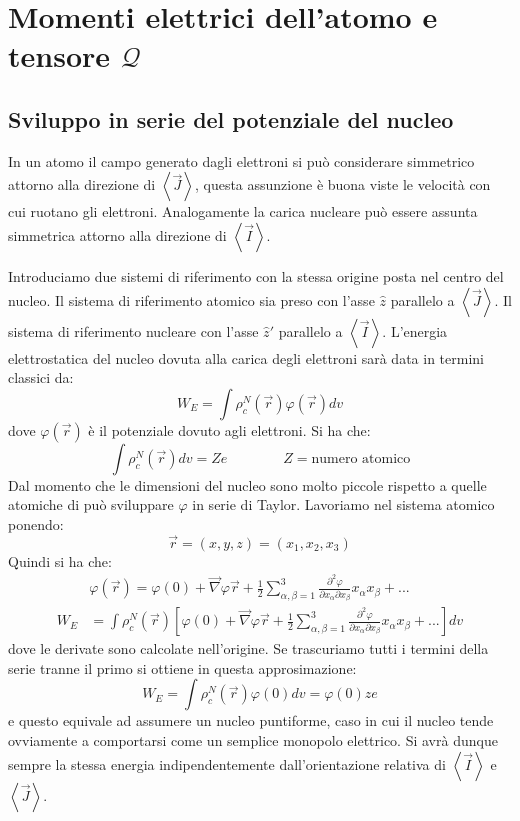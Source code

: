 \section{Momenti elettrici dell'atomo e tensore $\mathcal{Q}$}
\subsection{Sviluppo in serie del potenziale del nucleo}
In un atomo il campo generato dagli elettroni si può considerare simmetrico
attorno alla direzione di $\left\langle \vec{J} \right\rangle$, questa
assunzione è buona viste le velocità con cui ruotano gli elettroni. Analogamente
la carica nucleare può essere assunta simmetrica attorno alla direzione di
$\left\langle \vec{I} \right\rangle$.

Introduciamo due sistemi di riferimento con la stessa origine posta nel centro
del nucleo. Il sistema di riferimento atomico sia preso con l'asse $\hat{z}$
parallelo a $\left\langle \vec{J} \right\rangle$. Il sistema di riferimento
nucleare con l'asse $\hat{z}'$ parallelo a $\left\langle \vec{I} \right\rangle$.
L'energia elettrostatica del nucleo dovuta alla carica degli elettroni sarà data
in termini classici da:
\begin{equation}
W_E = \int \rho^N_c{(\vec{r})} \varphi{(\vec{r})} dv
\end{equation}
dove $\varphi{(\vec{r})}$ è il potenziale dovuto agli elettroni. Si ha che:
\begin{equation}
\int \rho^{N}_c{(\vec{r})} dv = Ze \qquad \qquad Z = \text{numero atomico}
\end{equation}
Dal momento che le dimensioni del nucleo sono molto piccole rispetto a quelle
atomiche di può sviluppare $\varphi$ in serie di Taylor. Lavoriamo nel sistema
atomico ponendo:
\begin{equation}
\vec{r} = (x, y,z) = (x_1, x_2, x_3)
\end{equation}
Quindi si ha che:
\begin{equation}
\begin{split}
&\varphi{(\vec{r})} = \varphi{(0)} + \vec{\nabla} \varphi \vec{r} + \frac{1}{2} \sum_{\alpha, \beta = 1}^3 \frac{\partial^2 \varphi}{\partial x_{\alpha} \partial x_{\beta}} x_{\alpha} x_{\beta} + ...\\
W_E &= \int \rho^{N}_{c} (\vec{r}) \left[ \varphi{(0)} + \vec{\nabla} \varphi \vec{r} + \frac{1}{2} \sum_{\alpha, \beta = 1}^3 \frac{\partial^2 \varphi}{\partial x_{\alpha} \partial x_{\beta}} x_{\alpha} x_{\beta} + ... \right] dv
\end{split}
\end{equation}
dove le derivate sono calcolate nell'origine. Se trascuriamo tutti i termini
della serie tranne il primo si ottiene in questa approsimazione:
\begin{equation}
W_E = \int \rho^{N}_c{(\vec{r})} \varphi{(0)} dv = \varphi{(0)} z e
\end{equation}
e questo equivale ad assumere un nucleo puntiforme, caso in cui il nucleo tende
ovviamente a comportarsi come un semplice monopolo elettrico. Si avrà dunque
sempre la stessa energia indipendentemente dall'orientazione relativa di
$\left\langle \vec{I} \right\rangle$ e $\left\langle \vec{J} \right\rangle$.

